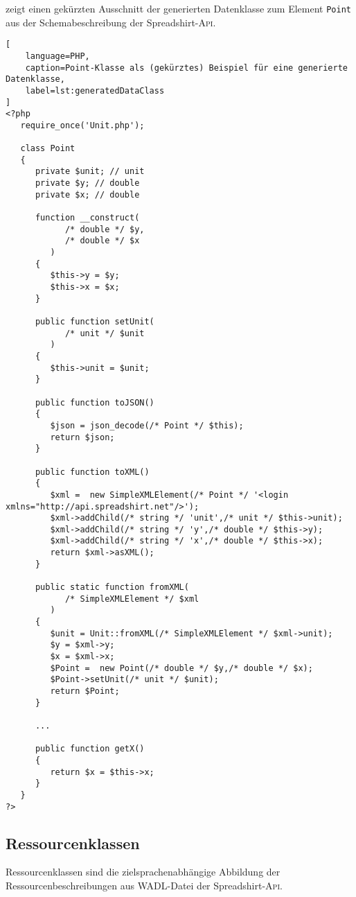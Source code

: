  zeigt einen gekürzten Ausschnitt der generierten Datenklasse zum Element \texttt{Point} aus der Schemabeschreibung der Spreadshirt-\textsc{Api}.

\begin{lstlisting}[
    language=PHP,
    caption=Point-Klasse als (gekürztes) Beispiel für eine generierte Datenklasse,
    label=lst:generatedDataClass
]
<?php
   require_once('Unit.php');

   class Point
   {
      private $unit; // unit 
      private $y; // double 
      private $x; // double 

      function __construct(
            /* double */ $y,
            /* double */ $x
         )
      {
         $this->y = $y;
         $this->x = $x;
      }

      public function setUnit(
            /* unit */ $unit
         )
      {
         $this->unit = $unit;
      }

      public function toJSON()
      {
         $json = json_decode(/* Point */ $this);
         return $json;
      }

      public function toXML()
      {
         $xml =  new SimpleXMLElement(/* Point */ '<login xmlns="http://api.spreadshirt.net"/>');
         $xml->addChild(/* string */ 'unit',/* unit */ $this->unit);
         $xml->addChild(/* string */ 'y',/* double */ $this->y);
         $xml->addChild(/* string */ 'x',/* double */ $this->x);
         return $xml->asXML();
      }

      public static function fromXML(
            /* SimpleXMLElement */ $xml
         )
      {
         $unit = Unit::fromXML(/* SimpleXMLElement */ $xml->unit);
         $y = $xml->y;
         $x = $xml->x;
         $Point =  new Point(/* double */ $y,/* double */ $x);
         $Point->setUnit(/* unit */ $unit);
         return $Point;
      }

      ...

      public function getX()
      {
         return $x = $this->x;
      }
   }
?>
\end{lstlisting}

\subsection{Ressourcenklassen}
\label{sec:ressourceclasses}

Ressourcenklassen sind die zielsprachenabhängige Abbildung der Ressourcenbeschreibungen aus WADL-Datei der Spreadshirt-\textsc{Api}.

